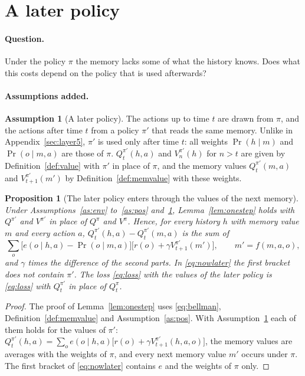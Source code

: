 \documentclass{article}
\newtheorem{proposition}{Proposition}[section]
\theoremstyle{definition}
\newtheorem{assumption}{Assumption}
\begin{document}
\section{A later policy}\label{sec:layer6}

\paragraph{Question.} Under the policy $\pi$ the memory lacks some of what the history knows. Does what this costs depend on the policy that is used afterwards?

\paragraph{Assumptions added.}
\begin{assumption}[A later policy]\label{as:later}
The actions up to time $t$ are drawn from $\pi$, and the actions after time $t$ from a policy $\pi'$ that reads the same memory. Unlike in Appendix~\ref{sec:layer5}, $\pi'$ is used only after time $t$: all weights $\Pr(h\mid m)$ and $\Pr(o\mid m,a)$ are those of $\pi$. $Q^{\pi'}_t(h,a)$ and $V^{\pi'}_n(h)$ for $n>t$ are given by Definition~\ref{def:value} with $\pi'$ in place of $\pi$, and the memory values $Q^{\pi'}_t(m,a)$ and $V^{\pi'}_{t+1}(m')$ by Definition~\ref{def:memvalue} with these weights.
\end{assumption}

\begin{proposition}[The later policy enters through the values of the next memory]\label{prop:later}
Under Assumptions~\ref{as:env} to~\ref{as:pos} and~\ref{as:later}, Lemma~\ref{lem:onestep} holds with $Q^{\pi'}$ and $V^{\pi'}$ in place of $Q^\pi$ and $V^\pi$. Hence, for every history $h$ with memory value $m$ and every action $a$, $Q^{\pi'}_t(h,a)-Q^{\pi'}_t(m,a)$ is the sum of
\begin{equation}\label{eq:nowlater}
\sum_o\big[e(o\mid h,a)-\Pr(o\mid m,a)\big]\big[r(o)+\gamma V^{\pi'}_{t+1}(m')\big],\qquad m'=f(m,a,o),
\end{equation}
and $\gamma$ times the difference of the second parts. In \eqref{eq:nowlater} the first bracket does not contain $\pi'$. The loss \eqref{eq:loss} with the values of the later policy is \eqref{eq:loss} with $Q^{\pi'}_t$ in place of $Q^\pi_t$.
\end{proposition}

\begin{proof}
The proof of Lemma~\ref{lem:onestep} uses \eqref{eq:bellman}, Definition~\ref{def:memvalue} and Assumption~\ref{as:pos}. With Assumption~\ref{as:later} each of them holds for the values of $\pi'$: $Q^{\pi'}_t(h,a)=\sum_oe(o\mid h,a)\big[r(o)+\gamma V^{\pi'}_{t+1}(h,a,o)\big]$, the memory values are averages with the weights of $\pi$, and every next memory value $m'$ occurs under $\pi$. The first bracket of \eqref{eq:nowlater} contains $e$ and the weights of $\pi$ only.
\end{proof}
\end{document}
